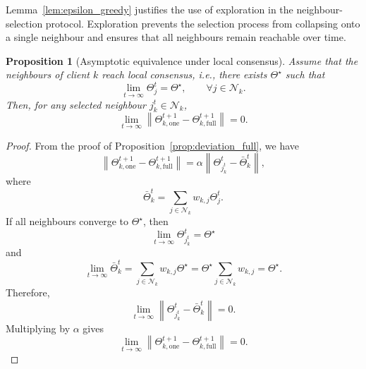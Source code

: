 \documentclass[conference]{IEEEtran}
\newtheorem{proposition}{Proposition}
\begin{document}
Lemma~\ref{lem:epsilon_greedy} justifies the use of exploration in the neighbour-selection protocol. Exploration prevents the selection process from collapsing onto a single neighbour and ensures that all neighbours remain reachable over time.

\begin{proposition}[Asymptotic equivalence under local consensus]
\label{prop:asymptotic_equivalence}
Assume that the neighbours of client $k$ reach local consensus, i.e., there exists $\Theta^\star$ such that
\begin{equation}
\lim_{t\rightarrow\infty}
\Theta_j^t
=
\Theta^\star,
\qquad
\forall j\in\mathcal{N}_k.
    \label{eq:auto-067}
\end{equation}
Then, for any selected neighbour $j_k^t\in\mathcal{N}_k$,
\begin{equation}
\lim_{t\rightarrow\infty}
\left\|
\Theta_{k,\mathrm{one}}^{t+1}
-
\Theta_{k,\mathrm{full}}^{t+1}
\right\|
=
0.
    \label{eq:auto-068}
\end{equation}
\end{proposition}

\begin{proof}
From the proof of Proposition~\ref{prop:deviation_full}, we have
\begin{equation}
\left\|
\Theta_{k,\mathrm{one}}^{t+1}
-
\Theta_{k,\mathrm{full}}^{t+1}
\right\|
=
\alpha
\left\|
\Theta_{j_k^t}^t-\bar{\Theta}_k^t
\right\|,
    \label{eq:auto-069}
\end{equation}
where
\begin{equation}
\bar{\Theta}_k^t
=
\sum_{j\in\mathcal{N}_k}w_{k,j}\Theta_j^t.
    \label{eq:auto-070}
\end{equation}
If all neighbours converge to $\Theta^\star$, then
\begin{equation}
\lim_{t\rightarrow\infty}\Theta_{j_k^t}^t=\Theta^\star
    \label{eq:auto-071}
\end{equation}
and
\begin{equation}
\lim_{t\rightarrow\infty}\bar{\Theta}_k^t
=
\sum_{j\in\mathcal{N}_k}w_{k,j}\Theta^\star
=
\Theta^\star
\sum_{j\in\mathcal{N}_k}w_{k,j}
=
\Theta^\star.
    \label{eq:auto-072}
\end{equation}
Therefore,
\begin{equation}
\lim_{t\rightarrow\infty}
\left\|
\Theta_{j_k^t}^t-\bar{\Theta}_k^t
\right\|
=
0.
    \label{eq:auto-073}
\end{equation}
Multiplying by $\alpha$ gives
\begin{equation}
\lim_{t\rightarrow\infty}
\left\|
\Theta_{k,\mathrm{one}}^{t+1}
-
\Theta_{k,\mathrm{full}}^{t+1}
\right\|
=
0.
    \label{eq:auto-074}
\end{equation}
\end{proof}
\end{document}
